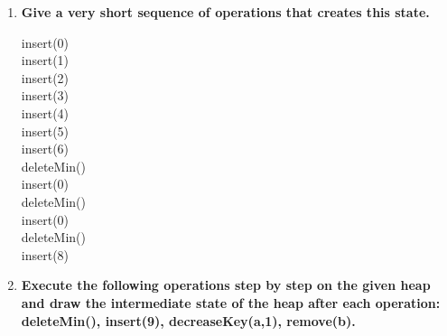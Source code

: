 \begin{enumerate}
    \item \textbf{Give a very short sequence of operations that creates this state.}
    
    insert(0) \\
    insert(1) \\
    insert(2) \\
    insert(3) \\
    insert(4) \\
    insert(5) \\
    insert(6) \\
    deleteMin() \\
    insert(0) \\
    deleteMin() \\
    insert(0) \\
    deleteMin() \\
    insert(8) 
    
    \item \textbf{Execute the following operations step by step on the given heap and draw the intermediate state of the heap after each operation: deleteMin(), insert(9), decreaseKey(a,1), remove(b).}

    \begin{center}
    \end{center}

\end{enumerate}